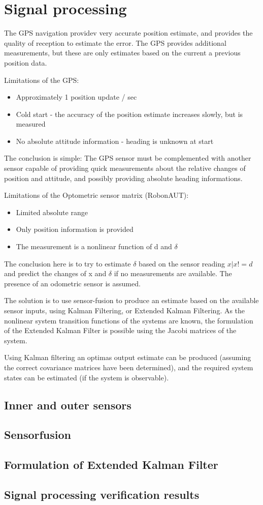 \section{Signal processing}

The GPS navigation providev very accurate position estimate, and provides the quality of reception to estimate the error. The GPS provides additional measurements, but these are only estimates based on the current a previous position data.

Limitations of the GPS:
\begin{itemize}
\item Approximately 1 position update / sec
\item Cold start - the accuracy of the position estimate increases slowly, but is measured
\item No absolute attitude information - heading is unknown at start
\end{itemize}

The conclusion is simple: The GPS sensor must be complemented with another sensor capable of providing quick measurements about the relative changes of position and attitude, and possibly providing absolute heading informations.

Limitations of the Optometric sensor matrix (RobonAUT):
\begin{itemize}
\item Limited absolute range
\item Only position information is provided
\item The measurement is a nonlinear function of d and $\delta$
\end{itemize}

The conclusion here is to try to estimate $\delta$ based on the sensor reading $x | x!=d$ and predict the changes of x and $\delta$ if no measurements are available. The presence of an odometric sensor is assumed.

The solution is to use sensor-fusion to produce an estimate based on the available sensor inputs, using Kalman Filtering, or Extended Kalman Filtering.
As the nonlinear system transition functions of the systems are known, the formulation of the Extended Kalman Filter is possible using the Jacobi matrices of the system.

Using Kalman filtering an optimas output estimate can be produced (assuming the correct covariance matrices have been determined), and the required system states can be estimated (if the system is observable).

\subsection{Inner and outer sensors}

\subsection{Sensorfusion}

\subsection{Formulation of Extended Kalman Filter}

\subsection{Signal processing verification results}